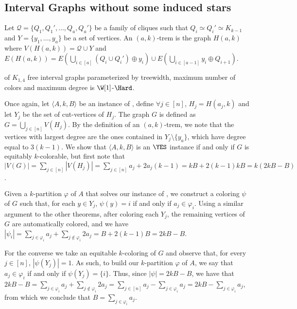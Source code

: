 \subsection{Interval Graphs without some induced stars}


\begin{definition}
    Let $\mathcal{Q} = \{Q_1, Q_1', \dots, Q_a, Q_a'\}$ be a family of cliques such that $Q_i \simeq Q_i' \simeq K_{k-1}$ and $Y = \{y_1, \dots, y_a\}$ be a set of vertices.
    An $(a,k)$-trem is the graph $H(a,k)$ where $V\left(H(a,k)\right) = \mathcal{Q} \cup Y$ and $E\left(H(a,k)\right) = E\left(\bigcup_{i \in [a]} (Q_i \cup Q_i') \oplus y_i\right) \cup E\left(\bigcup_{i \in [a-1]} y_i \oplus Q_{i+1}\right)$.
\end{definition}

\begin{theorem}
    \label{thm:chordal_w1_hard}
     of $K_{1,4}$ free interval graphs parameterized by treewidth, maximum number of colors and maximum degree is $\W[1]$-$\Hard$.
\end{theorem}

\begin{tproof}
    Once again, let $\langle A,k,B\rangle$ be an instance of , define $\forall j \in [n]$, $H_j = H(a_j, k)$ and let $Y_j$ be the set of cut-vertices of $H_j$.
    The graph $G$ is defined as $G = \bigcup_{j \in [n]} V(H_j)$.
    By the definition of an $(a,k)$-trem, we note that the vertices with largest degree are the ones contained in $Y_j \setminus \{y_a\}$, which have degree equal to $3(k-1)$.
    We show that $\langle A,k,B\rangle$ is an $\YES$ instance if and only if $G$ is equitably $k$-colorable, but first note that $|V(G)| = \sum_{j \in [n]} |V(H_j)| = \sum_{j \in [n]} a_j + 2a_j(k-1) = kB + 2(k-1)kB = k(2kB - B)$.
    
    Given a $k$-partition $\varphi$ of $A$ that solves our instance of , we construct a coloring $\psi$ of $G$ such that, for each $y \in Y_j$, $\psi(y) = i$ if and only if $a_j \in \varphi_i$.
    Using a similar argument to the other theorems, after coloring each $Y_j$, the remaining vertices of $G$ are automatically colored, and we have  $|\psi_i| = \sum_{j \in \varphi_i} a_j + \sum_{j \notin \varphi_i} 2a_j = B + 2(k-1)B = 2kB - B$.
    
    For the converse we take an equitable $k$-coloring of $G$ and observe that, for every $j \in [n]$, $|\psi(Y_j)| = 1$.
    As such, to build our $k$-partition $\varphi$ of $A$, we say that $a_j \in \varphi_i$ if and only if $\psi(Y_j) = \{i\}$.
    Thus, since $|\psi| = 2kB - B$, we have that $2kB - B = \sum_{j \in \varphi_i} a_j + \sum_{j \notin \varphi_i} 2a_j = \sum_{j \in [n]} a_j - \sum_{j \in \varphi_i} a_j = 2kB - \sum_{j \in \varphi_i} a_j$, from which we conclude that $B = \sum_{j \in \varphi_i} a_j$.
\end{tproof}